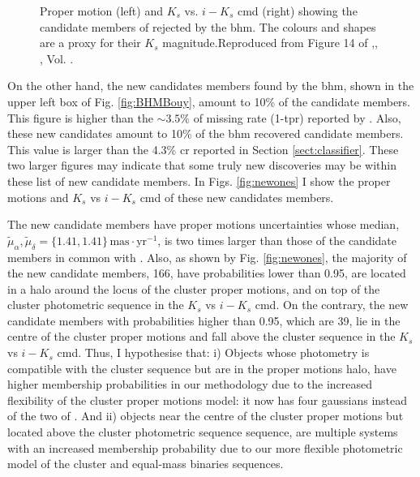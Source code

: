 \begin{figure}[htbp]
\begin{center}
\caption{Proper motion (left) and $K_s$ vs. $i-K_s$ \gls{cmd} (right) showing the candidate members of \citet{Bouy2015} rejected by the \gls{bhm}. The colours and shapes are a proxy for their $K_s$ magnitude.Reproduced from Figure 14 of \citet{Olivares2017},\textit{}, , Vol. .}
\label{fig:rejectedsCOLORS}
\end{center}
\end{figure}

On the other hand, the new candidates members found by the \gls{bhm}, shown in the upper left box of Fig. \ref{fig:BHMBouy}, amount to 10\% of the \citet{Bouy2015} candidate members. This figure is higher than the $\sim 3.5\%$ of missing rate (1-\gls{tpr}) reported by \citet{Sarro2014}. Also, these new candidates amount to 10\% of the \gls{bhm} recovered candidate members. This value is larger than the 4.3\% \gls{cr} reported in Section \ref{sect:classifier}. These two larger figures may indicate that some truly new discoveries may be within these list of new candidate members. In Figs. \ref{fig:newones} I show the proper motions and $K_s$ vs $i-K_s$ \gls{cmd} of these new candidates members.

The new candidate members have proper motions uncertainties whose median, $\tilde{\mu}_{\alpha},\tilde{\mu}_{\delta}=\{1.41,1.41\} \,\mathrm{mas\cdot yr^{-1}}$, is two times larger than those of the candidate members in common with \citet{Bouy2015}. Also, as shown by Fig. \ref{fig:newones}, the majority of the new candidate members, 166, have probabilities lower than 0.95, are located in a halo around the locus of the cluster proper motions, and on top of the cluster photometric sequence in the $K_s$ vs $i-K_s$ \gls{cmd}. On the contrary, the new candidate members with probabilities higher than 0.95, which are 39, lie in the centre of the cluster proper motions and fall above the cluster sequence in the $K_s$ vs $i-K_s$ \gls{cmd}. Thus, I hypothesise that: i) Objects whose photometry is compatible with the cluster sequence but are in the proper motions halo, have higher membership probabilities in our methodology due to the increased flexibility of the cluster proper motions model: it now has four gaussians instead of the two of \citet{Bouy2015}. And ii) objects near the centre of the cluster proper motions but located above the cluster photometric sequence sequence, are multiple systems \cite[probably triple systems which can amount to 4\% of the population][]{Duquennoy1991} with an increased membership probability due to our more flexible photometric model of the cluster and equal-mass binaries sequences.

